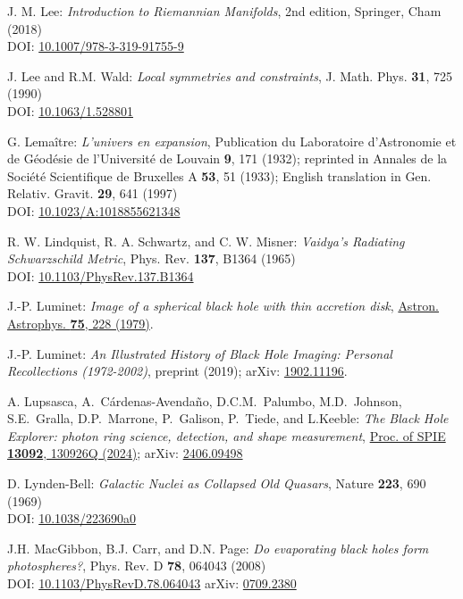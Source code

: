 \begin{thebibliography}{123}
J. M. Lee:
{\em Introduction to Riemannian Manifolds}, 2nd edition,
Springer, Cham (2018)\\
DOI: \href{https://doi.org/10.1007/978-3-319-91755-9}{10.1007/978-3-319-91755-9}

J. Lee and R.M. Wald:
{\em Local symmetries and constraints},
J. Math. Phys. {\bf 31}, 725 (1990)\\
DOI: \href{https://doi.org/10.1063/1.528801}{10.1063/1.528801}

G. Lemaître: {\em L'univers en expansion},
Publication du Laboratoire d'Astronomie et de Géodésie de l'Université
de Louvain {\bf 9},  171 (1932); reprinted in
Annales de la Société Scientifique de Bruxelles A {\bf 53}, 51 (1933);
English translation in
Gen. Relativ. Gravit. {\bf 29}, 641 (1997)\\
DOI: \href{https://doi.org/10.1023/A:1018855621348}{10.1023/A:1018855621348}

R. W. Lindquist, R. A. Schwartz, and C. W. Misner:
{\em Vaidya's Radiating Schwarzschild Metric},
Phys. Rev. {\bf 137}, B1364 (1965)\\
DOI: \href{https://doi.org/10.1103/PhysRev.137.B1364}{10.1103/PhysRev.137.B1364}

J.-P. Luminet: {\em Image of a spherical black hole with thin accretion disk},
\href{http://adsabs.harvard.edu/abs/1979A%26A....75..228L}{Astron. Astrophys. {\bf 75}, 228 (1979)}.

J.-P. Luminet:
{\em An Illustrated History of Black Hole Imaging: Personal Recollections (1972-2002)}, preprint (2019);
arXiv: \href{https://arxiv.org/abs/1902.11196}{1902.11196}.

A. Lupsasca, A.~Cárdenas-Avendaño, D.C.M.~Palumbo, M.D.~Johnson, S.E.~Gralla, D.P.~Marrone, P.~Galison, P.~Tiede, and L.Keeble:
{\em The Black Hole Explorer: photon ring science, detection, and shape measurement},
\href{https://doi.org/10.1117/12.3019437}{Proc. of SPIE {\bf 13092}, 130926Q (2024)};
arXiv: \href{https://arxiv.org/abs/2406.09498}{2406.09498}

D. Lynden-Bell:
{\em Galactic Nuclei as Collapsed Old Quasars},
Nature {\bf 223}, 690 (1969)\\
DOI: \href{https://doi.org/10.1038/223690a0}{10.1038/223690a0}

J.H. MacGibbon, B.J. Carr, and D.N. Page:
{\em Do evaporating black holes form photospheres?},
Phys. Rev. D {\bf 78}, 064043 (2008)\\
DOI: \href{https://doi.org/10.1103/PhysRevD.78.064043}{10.1103/PhysRevD.78.064043}\hfill
arXiv: \href{https://arxiv.org/abs/0709.2380}{0709.2380}


\end{thebibliography}
